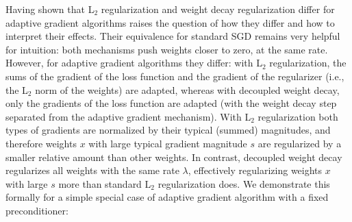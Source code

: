\documentclass[usenames,dvipsnames]{article} %
\newcommand{\norm}[1]{\left\lVert#1\right\rVert}
\newtheorem{prop}{Proposition}
\newcommand{\note}[1]{
	\noindent~\\
	\vspace{0.25cm}
	\fcolorbox{red}{yellow}{\parbox{0.97\textwidth}{#1\\}}
	\vspace{0.25cm}
}
\newcommand{\vc}[1]{\textit{\textbf{#1}}}
\begin{document}
Having shown that L$_2$ regularization and weight decay regularization differ for adaptive gradient algorithms raises the question of how they differ and how to interpret their effects. 
Their equivalence for standard SGD remains very helpful for intuition: both mechanisms push weights closer to zero, at the same rate.
However, for adaptive gradient algorithms they differ: with L$_2$  regularization, the sums of the gradient of the loss function and the gradient of the regularizer (i.e., the L$_2$  norm of the weights) are adapted, whereas with decoupled weight decay, only the gradients of the loss function are adapted (with the weight decay step separated from the adaptive gradient mechanism).
With L$_2$ regularization both types of gradients are normalized by their typical (summed) magnitudes, and therefore weights $x$ with large typical gradient magnitude $s$ are regularized by a smaller relative amount than other weights.
In contrast, decoupled weight decay regularizes all weights with the same rate $\lambda$, effectively regularizing weights $x$ with large $s$ more than standard L$_2$ regularization does.
We demonstrate this formally for a simple special case of adaptive gradient algorithm with a fixed preconditioner:

\end{document}
